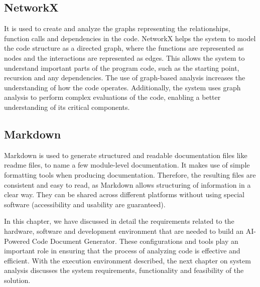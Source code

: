 \subsection{NetworkX}
\hspace{0.5cm}
It is used to create and analyze the graphs representing the relationships, function calls and dependencies in the code. NetworkX helps the system to model the code structure as a directed graph, where the functions are represented as nodes and the interactions are represented as edges. This allows the system to understand important parts of the program code, such as the starting point, recursion and any dependencies. The use of graph-based analysis increases the understanding of how the code operates. Additionally, the system uses graph analysis to perform complex evaluations of the code, enabling a better understanding of its critical components.

\subsection{Markdown}
\hspace{0.5cm}
Markdown is used to generate structured and readable documentation files like readme files, to name a few module-level documentation. It makes use of simple formatting tools when producing documentation. Therefore, the resulting files are consistent and easy to read, as Markdown allows structuring of information in a clear way. They can be shared across different platforms without using special software (accessibility and usability are guaranteed). 
\newline
\par In this chapter, we have discussed in detail the requirements related to the hardware, software and development environment that are needed to build an AI-Powered Code Document Generator. These configurations and tools play an important role in ensuring that the process of analyzing code is effective and efficient. With the execution environment described, the next chapter on system analysis discusses the system requirements, functionality and feasibility of the solution.

